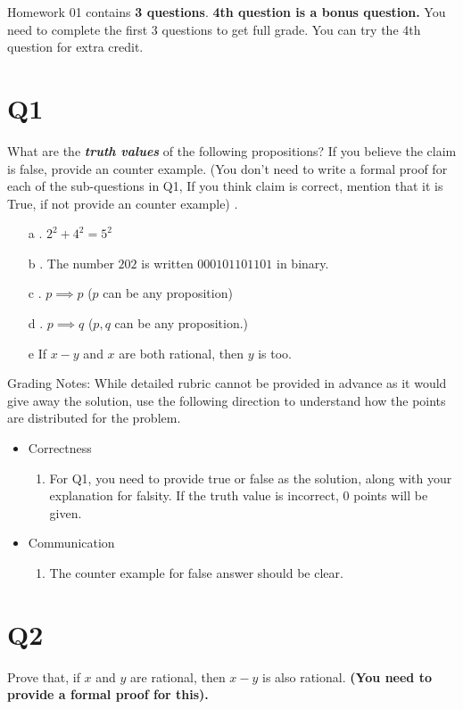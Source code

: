 \documentclass[12pt]{exam}
\begin{document}
Homework 01 contains \textbf{3 questions}. \textbf{4th question is a bonus question.} You need to complete the first 3 questions to get full grade. You can try the 4th question for extra credit.

\section{Q1}
What are the \textbf{\textit{truth values}} of the following propositions? If you believe the claim is false, provide an counter example. (You don't need to write a formal proof for each of the sub-questions in Q1, If you think claim is correct, mention that it is True, if not provide an counter example) .
\begin{enumerate}
    \item [a]. $2^2 + 4^2 = 5^2$
    \item [b]. The number $202$ is written $0001 0110 1101$ in binary.
    \item [c]. $p \implies p$ ($p$ can be any proposition)
    \item [d]. $p \implies q$ ($p,q$ can be any proposition.)
    \item [e] If $x-y$ and $x$ are both rational, then $y$ is too.
\end{enumerate}

Grading Notes:
While detailed rubric cannot be provided in advance as it would give away the solution, use the following direction to understand how the points are distributed for the problem.
\begin{itemize}
    \item Correctness
    \begin{enumerate}
        \item For Q1, you need to provide true or false as the solution, along with your explanation for falsity. If the truth value is incorrect, 0 points will be given.
    \end{enumerate}
        
    \item Communication 
        \begin{enumerate}
            \item The counter example for false answer should be clear.
        \end{enumerate}
\end{itemize}


\section{Q2}
Prove that, if $x$ and $y$ are rational, then $x-y$ is also rational. \textbf{(You need to provide a formal proof for this).}
\end{document}
